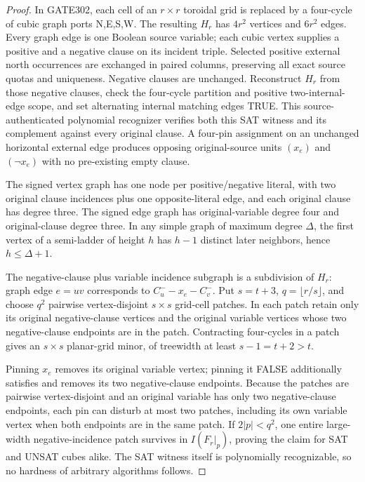 \documentclass[11pt]{article}
\begin{document}
\begin{proof}
In GATE302, each cell of an $r\times r$ toroidal grid is replaced by a four-cycle of cubic graph ports N,E,S,W. The resulting $H_r$ has $4r^2$ vertices and $6r^2$ edges. Every graph edge is one Boolean source variable; each cubic vertex supplies a positive and a negative clause on its incident triple. Selected positive external north occurrences are exchanged in paired columns, preserving all exact source quotas and uniqueness. Negative clauses are unchanged. Reconstruct $H_r$ from those negative clauses, check the four-cycle partition and positive two-internal-edge scope, and set alternating internal matching edges TRUE. This source-authenticated polynomial recognizer verifies both this SAT witness and its complement against every original clause. A four-pin assignment on an unchanged horizontal external edge produces opposing original-source units $(x_e)$ and $(\neg x_e)$ with no pre-existing empty clause.

The signed vertex graph has one node per positive/negative literal, with two original clause incidences plus one opposite-literal edge, and each original clause has degree three. The signed edge graph has original-variable degree four and original-clause degree three. In any simple graph of maximum degree $\Delta$, the first vertex of a semi-ladder of height $h$ has $h-1$ distinct later neighbors, hence $h\le\Delta+1$.

The negative-clause plus variable incidence subgraph is a subdivision of $H_r$: graph edge $e=uv$ corresponds to $C_u^--x_e-C_v^-$. Put $s=t+3$, $q=\lfloor r/s\rfloor$, and choose $q^2$ pairwise vertex-disjoint $s\times s$ grid-cell patches. In each patch retain only its original negative-clause vertices and the original variable vertices whose two negative-clause endpoints are in the patch. Contracting four-cycles in a patch gives an $s\times s$ planar-grid minor, of treewidth at least $s-1=t+2>t$.

Pinning $x_e$ removes its original variable vertex; pinning it FALSE additionally satisfies and removes its two negative-clause endpoints. Because the patches are pairwise vertex-disjoint and an original variable has only two negative-clause endpoints, each pin can disturb at most two patches, including its own variable vertex when both endpoints are in the same patch. If $2|p|<q^2$, one entire large-width negative-incidence patch survives in $I(F_r|_p)$, proving the claim for SAT and UNSAT cubes alike. The SAT witness itself is polynomially recognizable, so no hardness of arbitrary algorithms follows.
\end{proof}
\end{document}
